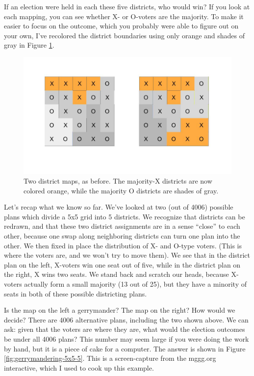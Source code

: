 \documentclass[
  openany]{book}
\begin{document}
If an election were held in each these five districts, who would win? If you look at each mapping, you can see whether X- or O-voters are the majority. To make it easier to focus on the outcome, which you probably were able to figure out on your own, I've recolored the district boundaries using only orange and shades of gray in Figure \ref{fig:gerrymandering-5x5-4}.

\begin{figure}

{\centering \includegraphics[width=0.9\linewidth]{images/gerrymandering5x5_4}

}

\caption{Two district maps, as before. The majority-X districts are now colored orange, while the majority O districts are shades of gray.}\label{fig:gerrymandering-5x5-4}
\end{figure}

Let's recap what we know so far. We've looked at two (out of 4006) possible plans which divide a 5x5 grid into 5 districts. We recognize that districts can be redrawn, and that these two district assignments are in a sense ``close'' to each other, because one swap along neighboring districts can turn one plan into the other. We then fixed in place the distribution of X- and O-type voters. (This is where the voters are, and we won't try to move them). We see that in the district plan on the left, X-voters win one seat out of five, while in the district plan on the right, X wins two seats. We stand back and scratch our heads, because X-voters actually form a small majority (13 out of 25), but they have a minority of seats in both of these possible districting plans.

Is the map on the left a gerrymander? The map on the right? How would we decide? There are 4006 alternative plans, including the two shown above. We can ask: given that the voters are where they are, what would the election outcomes be under all 4006 plans? This number may seem large if you were doing the work by hand, but it is a piece of cake for a computer. The answer is shown in Figure \ref{fig:gerrymandering-5x5-5}. This is a screen-capture from the mggg.org interactive, which I used to cook up this example.
\end{document}

